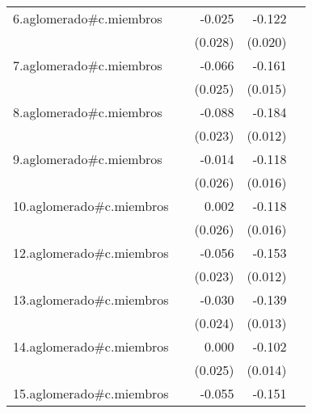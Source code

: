 {\begin{longtable}{l*{4}{D{.}{.}{-1}}}
\addlinespace
6.aglomerado#c.miembros&                     &      -0.025         &      -0.122\sym{***}&                     \\
            &                     &     (0.028)         &     (0.020)         &                     \\
\addlinespace
7.aglomerado#c.miembros&                     &      -0.066\sym{**} &      -0.161\sym{***}&                     \\
            &                     &     (0.025)         &     (0.015)         &                     \\
\addlinespace
8.aglomerado#c.miembros&                     &      -0.088\sym{***}&      -0.184\sym{***}&                     \\
            &                     &     (0.023)         &     (0.012)         &                     \\
\addlinespace
9.aglomerado#c.miembros&                     &      -0.014         &      -0.118\sym{***}&                     \\
            &                     &     (0.026)         &     (0.016)         &                     \\
\addlinespace
10.aglomerado#c.miembros&                     &       0.002         &      -0.118\sym{***}&                     \\
            &                     &     (0.026)         &     (0.016)         &                     \\
\addlinespace
12.aglomerado#c.miembros&                     &      -0.056\sym{*}  &      -0.153\sym{***}&                     \\
            &                     &     (0.023)         &     (0.012)         &                     \\
\addlinespace
13.aglomerado#c.miembros&                     &      -0.030         &      -0.139\sym{***}&                     \\
            &                     &     (0.024)         &     (0.013)         &                     \\
\addlinespace
14.aglomerado#c.miembros&                     &       0.000         &      -0.102\sym{***}&                     \\
            &                     &     (0.025)         &     (0.014)         &                     \\
\addlinespace
15.aglomerado#c.miembros&                     &      -0.055\sym{*}  &      -0.151\sym{***}&                     \\

\end{longtable}}
